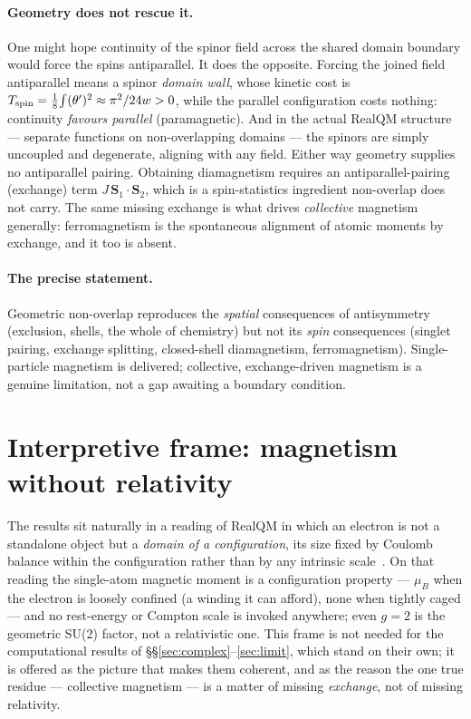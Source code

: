 \documentclass[11pt]{article}
\begin{document}
\paragraph{Geometry does not rescue it.} One might hope continuity of the spinor field across the shared
domain boundary would force the spins antiparallel. It does the opposite. Forcing the joined field
antiparallel means a spinor \emph{domain wall}, whose kinetic cost is
$T_{\rm spin}=\tfrac18\!\int(\theta')^2\approx\pi^2/24w>0$, while the parallel configuration costs nothing:
continuity \emph{favours parallel} (paramagnetic). And in the actual RealQM structure --- separate
functions on non-overlapping domains --- the spinors are simply uncoupled and degenerate, aligning with
any field. Either way geometry supplies no antiparallel pairing. Obtaining diamagnetism requires an
antiparallel-pairing (exchange) term $J\,\mathbf S_1\!\cdot\!\mathbf S_2$, which is a spin-statistics
ingredient non-overlap does not carry. The same missing exchange is what drives \emph{collective}
magnetism generally: ferromagnetism is the spontaneous alignment of atomic moments by exchange, and it too
is absent.

\paragraph{The precise statement.} Geometric non-overlap reproduces the \emph{spatial} consequences of
antisymmetry (exclusion, shells, the whole of chemistry) but not its \emph{spin} consequences (singlet
pairing, exchange splitting, closed-shell diamagnetism, ferromagnetism). Single-particle magnetism is
delivered; collective, exchange-driven magnetism is a genuine limitation, not a gap awaiting a boundary
condition.

\section{Interpretive frame: magnetism without relativity}
\label{sec:frame}

The results sit naturally in a reading of RealQM in which an electron is not a standalone object but a
\emph{domain of a configuration}, its size fixed by Coulomb balance within the configuration rather than
by any intrinsic scale~\cite{Charges}. On that reading the single-atom magnetic moment is a configuration
property --- $\mu_B$ when the electron is loosely confined (a winding it can afford), none when tightly
caged --- and no rest-energy or Compton scale is invoked anywhere; even $g=2$ is the geometric SU(2)
factor, not a relativistic one. This frame is not needed for the computational results of
\S\S\ref{sec:complex}--\ref{sec:limit}, which stand on their own; it is offered as the picture that makes
them coherent, and as the reason the one true residue --- collective magnetism --- is a matter of missing
\emph{exchange}, not of missing relativity.
\end{document}
